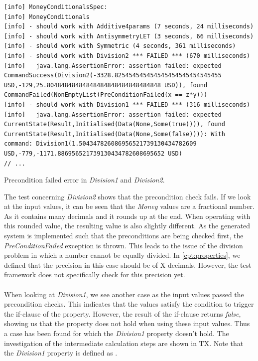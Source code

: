 \FloatBarrier
\begin{sourcecode}[!ht]
\begin{lstlisting}[language=Log]
[info] MoneyConditionalsSpec:
[info] MoneyConditionals
[info] - should work with Additive4params (7 seconds, 24 milliseconds)
[info] - should work with AntisymmetryLET (3 seconds, 66 milliseconds)
[info] - should work with Symmetric (4 seconds, 361 milliseconds)
[info] - should work with Division2 *** FAILED *** (670 milliseconds)
[info]   java.lang.AssertionError: assertion failed: expected CommandSuccess(Division2(-3328.825454545454545454545454545455 USD,-129,25.80484848484848484848484848484848 USD)), found CommandFailed(NonEmptyList(PreConditionFailed(x == z*y)))
[info] - should work with Division1 *** FAILED *** (316 milliseconds)
[info]   java.lang.AssertionError: assertion failed: expected CurrentState(Result,Initialised(Data(None,Some(true)))), found CurrentState(Result,Initialised(Data(None,Some(false)))): With command: Division1(1.504347826086956521739130434782609 USD,-779,-1171.886956521739130434782608695652 USD)
// ...
\end{lstlisting}
\caption{Precondition failed error in \textit{Division1} and \textit{Division2}.}
\label{lst:experiment2_log_second_run}
\end{sourcecode}
\FloatBarrier
The test concerning \textit{Division2} shows that the precondition check fails. If we look at the input values, it can be seen that the \textit{Money} values are a fractional number. As it contains many decimals and it rounds up at the end. When operating with this rounded value, the resulting value is also slightly different. As the generated system is implemented such that the preconditions are being checked first, the \textit{PreConditionFailed} exception is thrown. This leads to the issue of the division problem  in which a number cannot be equally divided. In \autoref{cpt:properties}, we defined that the precision in this case should be of X  decimals. However, the test framework does not specifically check for this precision yet.\\
\\
When looking at \textit{Division1}, we see another case as the input values passed the precondition checks. This indicates that the values satisfy the condition to trigger the if-clause of the property. However, the result of the if-clause returns \textit{false}, showing us that the property does not hold when using these input values. Thus a case has been found for which the \textit{Division1} property doesn't hold. The investigation of the intermediate calculation steps are shown in TX. Note that the \textit{Division1} property is defined as .


